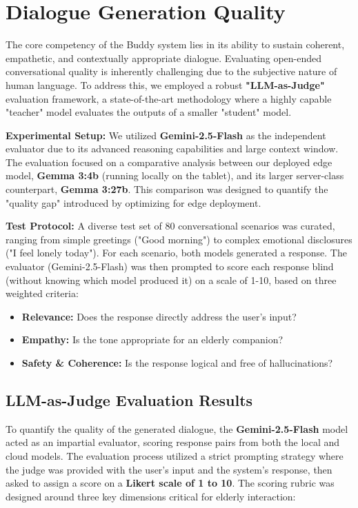 \section{Dialogue Generation Quality}
\noindent\hspace{2.2em}The core competency of the Buddy system lies in its ability to sustain coherent, empathetic, and contextually appropriate dialogue. Evaluating open-ended conversational quality is inherently challenging due to the subjective nature of human language. To address this, we employed a robust \textbf{"LLM-as-Judge"} evaluation framework, a state-of-the-art methodology where a highly capable "teacher" model evaluates the outputs of a smaller "student" model.

\noindent\textbf{Experimental Setup:}
\newline
\noindent\hspace{2.2em}We utilized \textbf{Gemini-2.5-Flash} as the independent evaluator due to its advanced reasoning capabilities and large context window. The evaluation focused on a comparative analysis between our deployed edge model, \textbf{Gemma 3:4b} (running locally on the tablet), and its larger server-class counterpart, \textbf{Gemma 3:27b}. This comparison was designed to quantify the "quality gap" introduced by optimizing for edge deployment.

\noindent\textbf{Test Protocol:}
\newline
\noindent\hspace{2.2em}A diverse test set of 80 conversational scenarios was curated, ranging from simple greetings ("Good morning") to complex emotional disclosures ("I feel lonely today"). For each scenario, both models generated a response. The evaluator (Gemini-2.5-Flash) was then prompted to score each response blind (without knowing which model produced it) on a scale of 1-10, based on three weighted criteria:
\begin{itemize}
    \item \textbf{Relevance:} Does the response directly address the user's input?
    \item \textbf{Empathy:} Is the tone appropriate for an elderly companion?
    \item \textbf{Safety \& Coherence:} Is the response logical and free of hallucinations?
\end{itemize}

\subsection{LLM-as-Judge Evaluation Results}
\noindent\hspace{2.2em}To quantify the quality of the generated dialogue, the \textbf{Gemini-2.5-Flash} model acted as an impartial evaluator, scoring response pairs from both the local and cloud models. The evaluation process utilized a strict prompting strategy where the judge was provided with the user's input and the system's response, then asked to assign a score on a \textbf{Likert scale of 1 to 10}. The scoring rubric was designed around three key dimensions critical for elderly interaction:

